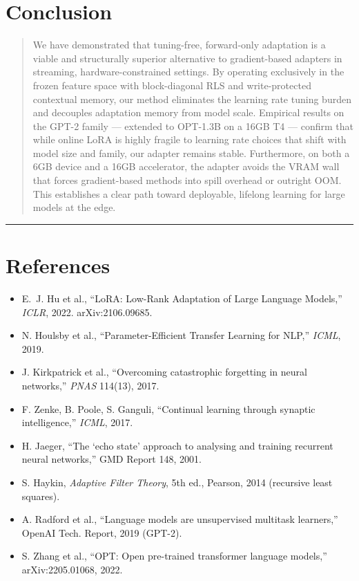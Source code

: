 \documentclass[11pt]{article}
\providecommand{\tightlist}{\setlength{\itemsep}{0pt}%
  \setlength{\parskip}{0pt}}
\begin{document}
\section{Conclusion}\label{conclusion}

\begin{quote}
We have demonstrated that tuning-free, forward-only adaptation is a viable and structurally superior alternative to gradient-based adapters in streaming, hardware-constrained settings. By operating exclusively in the frozen feature space with block-diagonal RLS and write-protected contextual memory, our method eliminates the learning rate tuning burden and decouples adaptation memory from model scale. Empirical results on the GPT-2 family --- extended to OPT-1.3B on a 16GB T4 --- confirm that while online LoRA is highly fragile to learning rate choices that shift with model size and family, our adapter remains stable. Furthermore, on both a 6GB device and a 16GB accelerator, the adapter avoids the VRAM wall that forces gradient-based methods into spill overhead or outright OOM. This establishes a clear path toward deployable, lifelong learning for large models at the edge.
\end{quote}

\begin{center}\rule{0.5\linewidth}{0.5pt}\end{center}

\section*{References}
\begin{itemize}\tightlist
\item E.~J. Hu et al., ``LoRA: Low-Rank Adaptation of Large Language
  Models,'' \emph{ICLR}, 2022. arXiv:2106.09685.
\item N. Houlsby et al., ``Parameter-Efficient Transfer Learning for
  NLP,'' \emph{ICML}, 2019.
\item J. Kirkpatrick et al., ``Overcoming catastrophic forgetting in
  neural networks,'' \emph{PNAS} 114(13), 2017.
\item F. Zenke, B. Poole, S. Ganguli, ``Continual learning through
  synaptic intelligence,'' \emph{ICML}, 2017.
\item H. Jaeger, ``The `echo state' approach to analysing and training
  recurrent neural networks,'' GMD Report 148, 2001.
\item S. Haykin, \emph{Adaptive Filter Theory}, 5th ed., Pearson, 2014
  (recursive least squares).
\item A. Radford et al., ``Language models are unsupervised multitask
  learners,'' OpenAI Tech. Report, 2019 (GPT-2).
\item S. Zhang et al., ``OPT: Open pre-trained transformer language
  models,'' arXiv:2205.01068, 2022.
\end{itemize}
\end{document}

